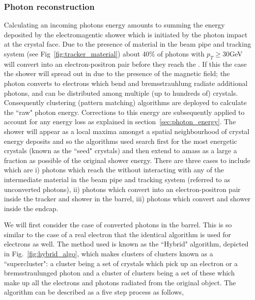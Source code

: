 \subsubsection{Photon reconstruction}

Calculating an incoming photons energy amounts to summing the energy deposited by the electromagentic shower which is initiated by the photon impact at the crystal face. Due to the presence of material in the beam pipe and tracking system (see Fig~\ref{fig:tracker_material}) about 40\% of photons with $p_{T}\geq30$GeV will convert into an electron-positron pair before they reach the \ECAL. If this the case the shower will spread out in \phi due to the presence of the magnetic field; the photon converts to electrons which bend and bremsstrauhlung radiate additional photons, and can be distributed among multiple (up to hundreds of) crystals. Consequently clustering (pattern matching) algorithms are deployed to calculate the ``raw" photon energy. Corrections to this energy are subsequently applied to account for any energy loss as explained in section~\ref{sec:photon_energy}. The shower will appear as a local maxima amongst a spatial neighbourhood of crystal energy deposits and so the algorithms used search first for the most energetic crystals (known as the ``seed" crystals) and then extend to amass as a large a fraction as possible of the original shower energy. There are three cases to include which are i) photons which reach the \ECAL without interacting with any of the intermediate material in the beam pipe and tracking system (referred to as unconverted photons), ii) photons which convert into an electron-positron pair inside the tracker and shower in the barrel, iii) photons which convert and shower inside the endcap.

We will first consider the case of converted photons in the barrel. This is so similar to the case of a real electron that the identical algorithm is used for electrons as well. The method used is known as the ``Hybrid" algorithm, depicted in Fig.~\ref{fig:hybrid_algo}, which makes clusters of clusters known as a ``supercluster": a cluster being a set of crystals which pick up an electron or a bremsstraulunged photon and a cluster of clusters being a set of these which make up all the electrons and photons radiated from the original object. The algorithm can be described as a five step process as follows,

